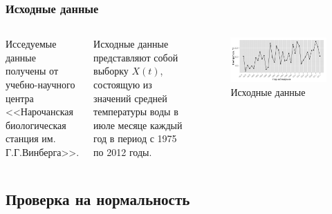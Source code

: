 \documentclass[10pt,pdf,aspectratio=169,hyperref={unicode}]{beamer}
\begin{document}
\begin{frame}
  \frametitle{Исходные данные}
  \begin{columns}[c]
  \column{2in}
  Исседуемые данные получены от учебно-научного центра <<Нарочанская биологическая станция им. Г.Г.Винберга>>.

  \vspace{0.5em}

  Исходные данные представляют собой выборку $ X(t) $, состоящую из значений средней температуры воды в июле месяце каждый год в период с 1975 по 2012 годы.
  \column{4in}
  \begin{figure}[h]
    \includegraphics[width=1\linewidth]{../../figures/source.png}
    \caption{Исходные данные}
  \end{figure}
  \end{columns}
\end{frame}

\subsection{Проверка на нормальность}
\end{document}
